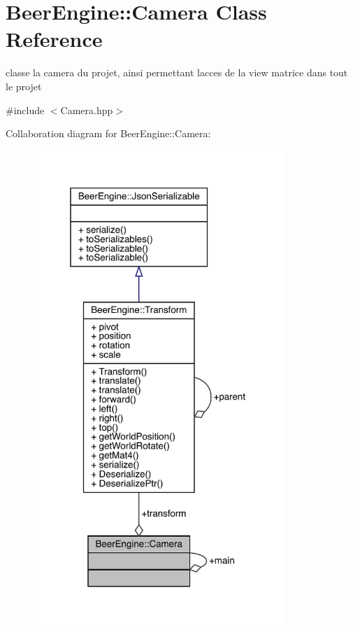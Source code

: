 \hypertarget{class_beer_engine_1_1_camera}{}\section{Beer\+Engine\+:\+:Camera Class Reference}
\label{class_beer_engine_1_1_camera}


classe la camera du projet, ainsi permettant l\textquotesingle{}acces de la view matrice dans tout le projet  




{\ttfamily \#include $<$Camera.\+hpp$>$}



Collaboration diagram for Beer\+Engine\+:\+:Camera\+:\nopagebreak
\begin{figure}[H]
\begin{center}
\leavevmode
\includegraphics[width=268pt]{class_beer_engine_1_1_camera__coll__graph}
\end{center}
\end{figure}
